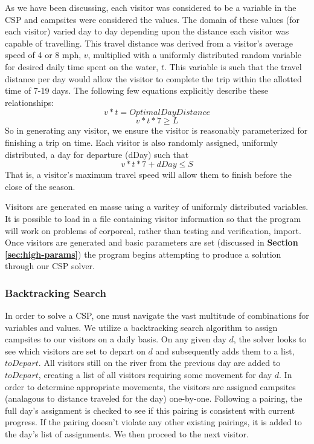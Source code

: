 \documentclass[11pt]{article} %
\begin{document}
As we have been discussing, each  visitor was considered to be a variable
in the CSP and campsites were considered the values.  The domain of these
values (for each  visitor) varied day to day depending upon the distance
each visitor was capable of travelling.  This travel distance was derived from
a visitor's average speed of 4 or 8 mph, $v$,  multiplied with a uniformly distributed
random variable for desired daily time spent on the water, $t$.  This variable is such
that the travel distance per day would allow the visitor to complete the trip
within the allotted time of 7-19 days. The following few equations explicitly
describe these relationships:
$$v*t=OptimalDayDistance$$
$$v*t*7\geq L$$
So in generating any  visitor, we ensure the visitor is reasonably
parameterized for finishing a trip on time.  Each visitor is also randomly
assigned, uniformly distributed, a day for departure (dDay) such that
$$v*t*7+dDay\leq S$$
That is, a visitor's maximum travel speed will allow them to finish before
the close of the season.

Visitors are generated en masse using a varitey of uniformly distributed
variables.  It is possible to load in a file containing visitor information
so that the program will work on problems of corporeal, rather than testing
and verification, import.  Once visitors are generated and basic parameters
are set (discussed in \textbf{Section \ref{sec:high-params}}) the program begins
attempting to produce a solution through our CSP solver.

\subsubsection{Backtracking Search}
In order to solve a CSP, one must navigate the vast multitude of combinations
for variables and values. We utilize a backtracking search algorithm to
assign campsites to our  visitors on a daily basis\cite{AI-Intro}.
On any given day
$d$, the solver looks to see which visitors are set to depart on $d$ and
subsequently adds them to a list, $toDepart$.  All visitors still on the
river from the previous day are added to $toDepart$, creating a list of all
 visitors requiring some movement for day $d$.  In order to determine
appropriate movements, the visitors are assigned campsites (analagous to
distance traveled for the day) one-by-one.  Following
a pairing, the full day's assignment is checked to see if this pairing is
consistent with current progress.  If the pairing doesn't violate any other
existing pairings, it is added to the day's list of assignments.  We then
proceed to the next  visitor.
\end{document}
